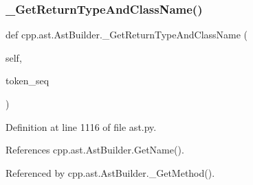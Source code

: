 \subsubsection{\texorpdfstring{\+\_\+\+Get\+Return\+Type\+And\+Class\+Name()}{\_GetReturnTypeAndClassName()}}
{\footnotesize\ttfamily def cpp.\+ast.\+Ast\+Builder.\+\_\+\+Get\+Return\+Type\+And\+Class\+Name (\begin{DoxyParamCaption}\item[{}]{self,  }\item[{}]{token\+\_\+seq }\end{DoxyParamCaption})\hspace{0.3cm}{\ttfamily [private]}}



Definition at line 1116 of file ast.\+py.



References cpp.\+ast.\+Ast\+Builder.\+Get\+Name().



Referenced by cpp.\+ast.\+Ast\+Builder.\+\_\+\+Get\+Method().


